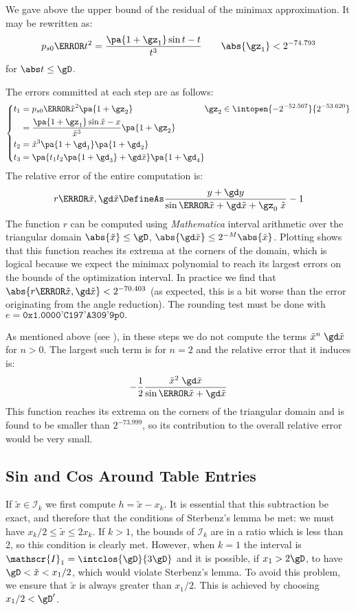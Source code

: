 \documentclass[10pt, a4paper, twoside]{basestyle}
\newcommand{\red}[1]{\tilde{#1}}
\begin{document}
We gave above the upper bound of the residual of the minimax approximation.  It may be rewritten as:
\[
p_{s0}\of{t^2} = \frac{\pa{1 + \gz_1} \sin t - t}{t^3} \qquad \abs{\gz_1} < 2^{-74.793}
\]
for $\abs t \le \gD$.

The errors committed at each step are as follows:
\[
\left\{
\begin{alignedat}{3}
t_1 &= p_{s0}\of{{\red x}^2} \pa{1 + \gz_2} &\gz_2 &\in \intopen{-2^{-52.567}}{2^{-53.620}} \\
&= \frac{\pa{1 + \gz_1} \sin {\red x} - x}{{\red x^3}} \pa{1 + \gz_2} \\
t_2 &= {\red x}^3 \pa{1 + \gd_1} \pa{1 + \gd_2} \\
t_3 &= \pa{t_1 t_2 \pa{1 + \gd_3} + \gd \red x} \pa{1 + \gd_4}
\end{alignedat}
\right.
\]
The relative error of the entire computation is:
\[
r\of{\red x, \gd \red x} \DefineAs \frac{y + \gd y}{\sin\of{\red x + \gd \red x + \gz_0 \; \red x}} - 1
\]
The function $r$ can be computed using \textit{Mathematica} interval arithmetic over the triangular domain $\abs{\red x} \le \gD$, $\abs{\gd \red x} \le 2^{-M} \abs{\red x}$.  Plotting shows that this function reaches its extrema at the corners of the domain, which is logical because we expect the minimax polynomial to reach its largest errors on the bounds of the optimization interval.  In practice we find that $\abs{r\of{\red x, \gd \red x}} < 2^{-70.403}$ (as expected, this is a bit worse than the error originating from the angle reduction).  The rounding test must be done with $e = \texttt{0x1.0000'C197'A309'9p0}.$

As mentioned above (see ), in these steps we do not compute the terms ${\red x}^n \; \gd \red x$ for $n > 0$.  The largest such term is for $n = 2$ and the relative error that it induces is:
\[
-\frac{1}{2} \frac{{\red x}^2 \; \gd \red x}{\sin\of{\red x + \gd \red x}}
\]
This function reaches its extrema on the corners of the triangular domain and is found to be smaller than $2^{-73.999}$, so its contribution to the overall relative error would be very small.

\subsection*{Sin and Cos Around Table Entries}\label{interval1}

If $\red x \in \mathscr{I}_k$ we first compute $h = \red x - x_k$.  It is essential that this subtraction be exact, and therefore that the conditions of Sterbenz's lemma be met: we must have $x_k / 2 \le \red x \le 2 x_k$.  If $k > 1$, the bounds of $\mathscr{I}_k$ are in a ratio which is less than 2, so this condition is clearly met.  However, when $k = 1$ the interval is $\mathscr{I}_1 = \intclos{\gD}{3 \gD}$ and it is possible, if $x_1 > 2 \gD$, to have  $\gD < \red x < x_1 /2$, which would violate Sterbenz's lemma.  To avoid this problem, we ensure that $\red x$ is always greater than $x_1 /2$.  This is achieved by choosing $x_1 / 2 < \gD'$.
\end{document}
